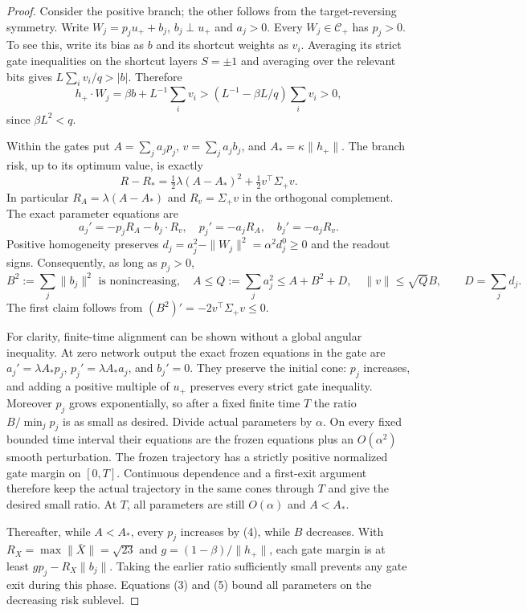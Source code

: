 \documentclass[11pt]{article}
\begin{document}
\begin{proof}
Consider the positive branch; the other follows from the target-reversing
symmetry. Write $W_j=p_j u_++b_j$, $b_j\perp u_+$ and $a_j>0$.
Every $W_j\in\mathcal C_+$ has $p_j>0$. To see this, write its bias
as $b$ and its shortcut weights as $v_i$. Averaging its strict gate
inequalities on the shortcut layers $S=\pm1$ and averaging over the
relevant bits gives $L\sum_i v_i/q>|b|$. Therefore
\[
 h_+\cdot W_j=\beta b+L^{-1}\sum_i v_i
 >\left(L^{-1}-\beta L/q\right)\sum_i v_i>0,
\]
since $\beta L^2<q$.

Within the gates put $A=\sum_j a_jp_j$, $v=\sum_j a_jb_j$, and
$A_*=\kappa\|h_+\|$. The branch risk, up to its optimum value, is
exactly
\[
 R-R_* = \tfrac12\lambda(A-A_*)^2+\tfrac12v^\top\Sigma_+v.
 \tag{3}
\]
In particular $R_A=\lambda(A-A_*)$ and $R_v=\Sigma_+v$ in the
orthogonal complement. The exact parameter equations are
\[
 a_j'=-p_jR_A-b_j\cdot R_v,\quad p_j'=-a_jR_A,
 \quad b_j'=-a_jR_v.\tag{4}
\]
Positive homogeneity preserves
$d_j=a_j^2-\|W_j\|^2=\alpha^2d_j^0\ge0$ and the readout signs.
Consequently, as long as $p_j>0$,
\[
 B^2:=\sum_j\|b_j\|^2\text{ is nonincreasing},\quad
 A\le Q:=\sum_j a_j^2\le A+B^2+D,\quad
 \|v\|\le\sqrt Q B,\qquad D=\sum_jd_j.\tag{5}
\]
The first claim follows from $(B^2)'=-2v^\top\Sigma_+v\le0$.

For clarity, finite-time alignment can be shown without a global
angular inequality. At zero network output the exact frozen equations
in the gate are
$a_j'=\lambda A_*p_j$, $p_j'=\lambda A_*a_j$, and $b_j'=0$.
They preserve the initial cone: $p_j$ increases, and adding a positive
multiple of $u_+$ preserves every strict gate inequality. Moreover
$p_j$ grows exponentially, so after a fixed finite time $T$ the ratio
$B/\min_jp_j$ is as small as desired. Divide actual parameters by
$\alpha$. On every fixed bounded time interval their equations are the
frozen equations plus an $O(\alpha^2)$ smooth perturbation. The frozen
trajectory has a strictly positive normalized gate margin on $[0,T]$.
Continuous dependence and a first-exit argument therefore keep the
actual trajectory in the same cones through $T$ and give the desired
small ratio. At $T$, all parameters are still $O(\alpha)$ and $A<A_*$.

Thereafter, while $A<A_*$, every $p_j$ increases by (4), while $B$
decreases. With $R_X=\max\|\bar X\|=\sqrt{23}$ and
$g=(1-\beta)/\|h_+\|$, each gate margin is at least
$g p_j-R_X\|b_j\|$. Taking the earlier ratio sufficiently small
prevents any gate exit during this phase. Equations (3) and (5)
bound all parameters on the decreasing risk sublevel.


\end{proof}
\end{document}
